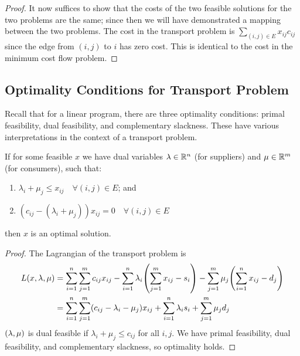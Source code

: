\begin{proof}
	\medskip\noindent It now suffices to show that the costs of the two feasible solutions for the two problems are the same; since then we will have demonstrated a mapping between the two problems.
	The cost in the transport problem is \( \sum_{(i,j) \in E} x_{ij} c_{ij} \) since the edge from \( (i,j) \) to \( i \) has zero cost.
	This is identical to the cost in the minimum cost flow problem.
\end{proof}

\subsection{Optimality Conditions for Transport Problem}
Recall that for a linear program, there are three optimality conditions: primal feasibility, dual feasibility, and complementary slackness.
These have various interpretations in the context of a transport problem.
\begin{theorem}
	If for some feasible \( x \) we have dual variables \( \vb \lambda \in \mathbb R^n \) (for suppliers) and \( \vb \mu \in \mathbb R^m \) (for consumers), such that:
	\begin{enumerate}
		\item \( \lambda_i + \mu_j \leq x_{ij} \quad \forall (i,j) \in E \); and
		\item \( (c_{ij} - (\lambda_i + \mu_j)) x_{ij} = 0 \quad \forall (i,j) \in E \)
	\end{enumerate}
	then \( x \) is an optimal solution.
\end{theorem}
\begin{proof}
	The Lagrangian of the transport problem is
	\begin{align*}
		L(x,\vb \lambda,\vb \mu) & = \sum_{i=1}^n \sum_{j=1}^m c_{ij}x_{ij} - \sum_{i=1}^n \lambda_i \qty(\sum_{j=1}^m x_{ij} - s_i) - \sum_{j=1}^m \mu_j \qty(\sum_{i=1}^n x_{ij} - d_j) \\
		                         & = \sum_{i=1}^n \sum_{j=1}^m (c_{ij} - \lambda_i - \mu_j) x_{ij} + \sum_{i=1}^n \lambda_i s_i + \sum_{j=1}^m \mu_j d_j
	\end{align*}
	\( (\vb \lambda, \vb \mu) \) is dual feasible if \( \lambda_i + \mu_j \leq c_{ij} \) for all \( i,j \).
	We have primal feasibility, dual feasibility, and complementary slackness, so optimality holds.
\end{proof}
